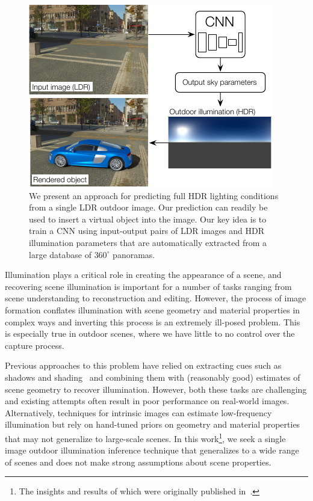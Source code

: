 
\begin{figure}
\centering
\includegraphics[width=\linewidth]{figures/teaser/teaser-skymodel.pdf}
\caption[Presentation of the proposed method]{We present an approach for predicting full HDR lighting conditions from a single LDR outdoor image. Our prediction can readily be used to insert a virtual object into the image. Our key idea is to train a CNN using input-output pairs of LDR images and HDR illumination parameters that are automatically extracted from a large database of $360^\circ$ panoramas.}
\label{fig:teaser}
\vspace{-1em}
\end{figure}

Illumination plays a critical role in creating the appearance of a scene, and recovering scene illumination is important for a number of tasks ranging from scene understanding to reconstruction and editing. However, the process of image formation conflates illumination with scene geometry and material properties in complex ways and inverting this process is an extremely ill-posed problem. This is especially true in outdoor scenes, where we have little to no control over the capture process.

Previous approaches to this problem have relied on extracting cues such as shadows and shading~\cite{lalonde-ijcv-12} and combining them with (reasonably good) estimates of scene geometry to recover illumination. However, both these tasks are challenging and existing attempts often result in poor performance on real-world images. Alternatively, techniques for intrinsic images can estimate low-frequency illumination but rely on hand-tuned priors on geometry and material properties~\cite{barron-pami-15,lombardi2016reflectance} that may not generalize to large-scale scenes. In this work\footnote{The insights and results of which were originally published in~\cite{holdgeoffroy-cvpr-17}.}, we seek a single image outdoor illumination inference technique that generalizes to a wide range of scenes and does not make strong assumptions about scene properties.

